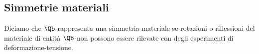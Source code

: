 %
%
%
%

\subsection{Simmetrie materiali}
Diciamo che $\Qb$ rappresenta una simmetria materiale se rotazioni o riflessioni del materiale di entità $\Qb$ non possono essere rilevate con degli esperimenti di deformazione-tensione.

